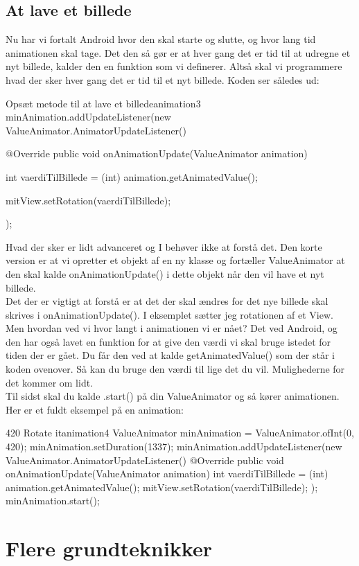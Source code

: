 \subsection{At lave et billede}
Nu har vi fortalt Android hvor den skal starte og slutte, og hvor lang tid animationen skal tage. Det den så gør er at hver gang det er tid til at udregne et nyt billede, kalder den en funktion som vi definerer. Altså skal vi programmere hvad der sker hver gang det er tid til et nyt billede. Koden ser således ud:
\begin{JavaCode}{Opsæt metode til at lave et billede}{animation3}
	minAnimation.addUpdateListener(new ValueAnimator.AnimatorUpdateListener() {
		@Override
		public void onAnimationUpdate(ValueAnimator animation) {
			int vaerdiTilBillede = (int) animation.getAnimatedValue();
			
			mitView.setRotation(vaerdiTilBillede);
		}
	});
\end{JavaCode}
Hvad der sker er lidt advanceret og I behøver ikke at forstå det. Den korte version er at vi opretter et objekt af en ny klasse og fortæller ValueAnimator at den skal kalde onAnimationUpdate() i dette objekt når den vil have et nyt billede.\\
Det der er vigtigt at forstå er at det der skal ændres for det nye billede skal skrives i onAnimationUpdate(). I eksemplet sætter jeg rotationen af et View. \\
Men hvordan ved vi hvor langt i animationen vi er nået? Det ved Android, og den har også lavet en funktion for at give den værdi vi skal bruge istedet for tiden der er gået. Du får den ved at kalde getAnimatedValue() som der står i koden ovenover. Så kan du bruge den værdi til lige det du vil. Mulighederne for det kommer om lidt. \\
Til sidst skal du kalde .start() på din ValueAnimator og så kører animationen. Her er et fuldt eksempel på en animation: 
\begin{JavaCode}{420 Rotate it}{animation4}
	ValueAnimator minAnimation = ValueAnimator.ofInt(0, 420);
	minAnimation.setDuration(1337);
	minAnimation.addUpdateListener(new ValueAnimator.AnimatorUpdateListener() {
		@Override
		public void onAnimationUpdate(ValueAnimator animation) {
			int vaerdiTilBillede = (int) animation.getAnimatedValue();
			mitView.setRotation(vaerdiTilBillede);
		}
	});
	minAnimation.start();
\end{JavaCode}
\section{Flere grundteknikker}
